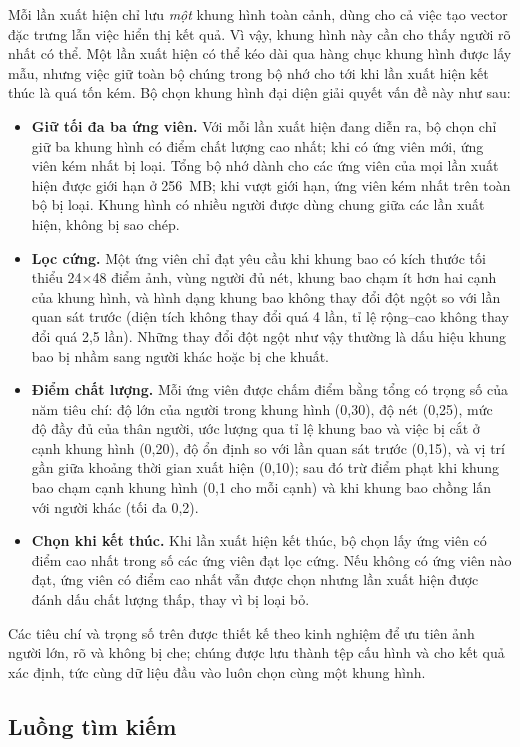Mỗi lần xuất hiện chỉ lưu \emph{một} khung hình toàn cảnh, dùng cho cả việc tạo vector đặc trưng lẫn việc hiển thị kết quả. Vì vậy, khung hình này cần cho thấy người rõ nhất có thể. Một lần xuất hiện có thể kéo dài qua hàng chục khung hình được lấy mẫu, nhưng việc giữ toàn bộ chúng trong bộ nhớ cho tới khi lần xuất hiện kết thúc là quá tốn kém. Bộ chọn khung hình đại diện giải quyết vấn đề này như sau:
\begin{itemize}
    \item \textbf{Giữ tối đa ba ứng viên.} Với mỗi lần xuất hiện đang diễn ra, bộ chọn chỉ giữ ba khung hình có điểm chất lượng cao nhất; khi có ứng viên mới, ứng viên kém nhất bị loại. Tổng bộ nhớ dành cho các ứng viên của mọi lần xuất hiện được giới hạn ở 256~MB; khi vượt giới hạn, ứng viên kém nhất trên toàn bộ bị loại. Khung hình có nhiều người được dùng chung giữa các lần xuất hiện, không bị sao chép.
    \item \textbf{Lọc cứng.} Một ứng viên chỉ đạt yêu cầu khi khung bao có kích thước tối thiểu 24$\times$48 điểm ảnh, vùng người đủ nét, khung bao chạm ít hơn hai cạnh của khung hình, và hình dạng khung bao không thay đổi đột ngột so với lần quan sát trước (diện tích không thay đổi quá 4 lần, tỉ lệ rộng--cao không thay đổi quá 2,5 lần). Những thay đổi đột ngột như vậy thường là dấu hiệu khung bao bị nhầm sang người khác hoặc bị che khuất.
    \item \textbf{Điểm chất lượng.} Mỗi ứng viên được chấm điểm bằng tổng có trọng số của năm tiêu chí: độ lớn của người trong khung hình (0,30), độ nét (0,25), mức độ đầy đủ của thân người, ước lượng qua tỉ lệ khung bao và việc bị cắt ở cạnh khung hình (0,20), độ ổn định so với lần quan sát trước (0,15), và vị trí gần giữa khoảng thời gian xuất hiện (0,10); sau đó trừ điểm phạt khi khung bao chạm cạnh khung hình (0,1 cho mỗi cạnh) và khi khung bao chồng lấn với người khác (tối đa 0,2).
    \item \textbf{Chọn khi kết thúc.} Khi lần xuất hiện kết thúc, bộ chọn lấy ứng viên có điểm cao nhất trong số các ứng viên đạt lọc cứng. Nếu không có ứng viên nào đạt, ứng viên có điểm cao nhất vẫn được chọn nhưng lần xuất hiện được đánh dấu chất lượng thấp, thay vì bị loại bỏ.
\end{itemize}
Các tiêu chí và trọng số trên được thiết kế theo kinh nghiệm để ưu tiên ảnh người lớn, rõ và không bị che; chúng được lưu thành tệp cấu hình và cho kết quả xác định, tức cùng dữ liệu đầu vào luôn chọn cùng một khung hình.

\subsection{Luồng tìm kiếm}
\label{sec:5.2.3}

